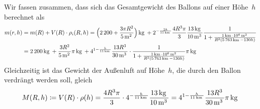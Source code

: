 \documentclass[../full]{subfiles}
\newcommand\Unit[2][]{
    \mskip \thinmuskip \relax \mathrm{#2}^{#1} \mskip \thinmuskip \relax
}
\newcommand\kg{\Unit{kg}}
\newcommand\m[1][]{\Unit[#1]{m}}
\newcommand\km[1][]{\Unit[#1]{km}}
\newcommand\ThousandSep{\,}
\begin{document}
    Wir fassen zusammen, dass sich das Gesamtgewicht des Ballons
    auf einer H\"ohe~\( h \) berechnet als
    \begin{align*}
        m \paren{r, h} &
        = m \paren{R} + V \paren{R} \cdot \rho_i \paren{R, h}
        = \paren[\Big]{2\ThousandSep 200 + \frac{3 \pi R^2}{5 \m[2]}} \kg
        + 2^{-\frac{2h}{11 \km}} \frac{4 R^3 \pi}{3} \frac{13 \kg}{10 \m[3]}
            \frac
                {1}
                {
                    1 + \frac
                        {1 \km \cdot 10^6 \m[2]}
                        {R^2 \paren{5\ThousandSep 763 \km - 130h}}
                }
        \\ &
        = 2\ThousandSep 200 \kg + \frac{3 R^2}{5 \m[2]} \pi \kg
            + 4^{1 - \frac{h}{11 \km}} \frac{13 R^3}{30 \m[3]} \cdot \frac
                {1}
                {
                    1 + \frac
                        {1 \km \cdot 10^6 \m[2]}
                        {R^2 \paren{5\ThousandSep 763 \km - 130h}}
                } \pi \kg
    \end{align*}
    Gleichzeitig ist das Gewicht der Au\ss enluft auf H\"ohe~\( h \),
    die durch den Ballon verdr\"angt werden soll,
    gleich
    \begin{equation*}
        M \paren{R, h}
        \coloneqq V \paren{R} \cdot \rho \paren{h}
        = \frac{4 R^3 \pi}{3}
            \cdot 4^{-\frac{h}{11 \km}} \frac{13 \kg}{10 \m[3]}
        = 4^{1 - \frac{h}{11 \km}} \frac{13 R^3}{30 \m[3]} \pi \kg
    \end{equation*}
\end{document}
